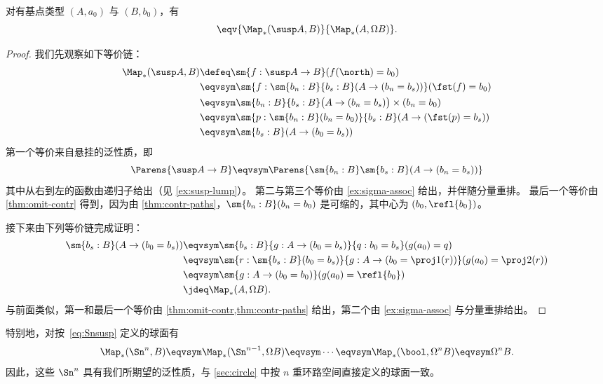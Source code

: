 \begin{lem}\label{lem:susp-loop-adj}
  对有基点类型 $(A,a_0)$ 与 $(B,b_0)$，有
  \[ \eqv{\Map_*(\susp A, B)}{\Map_*(A,\Omega B)}.\]
\end{lem}
\addtocounter{thm}{1}           %
\begin{proof}
我们先观察如下等价链：
\begin{align*}
\Map_*(\susp A, B) & \defeq \sm{f:\susp A\to B} (f(\north)=b_0) \\
                   & \eqvsym \sm{f:\sm{b_n : B}{b_s : B} (A \to (b_n = b_s))} (\fst(f)=b_0) \\
                   & \eqvsym \sm{b_n : B}{b_s : B} \big(A \to (b_n = b_s)\big) \times (b_n=b_0) \\
                   & \eqvsym \sm{p : \sm{b_n : B} (b_n=b_0)}{b_s : B} (A \to (\fst(p) = b_s)) \\
                   & \eqvsym \sm{b_s : B} (A \to (b_0 = b_s))
\end{align*}
第一个等价来自悬挂的泛性质，即
\[ \Parens{\susp A \to B} \eqvsym \Parens{\sm{b_n : B} \sm{b_s : B} (A \to (b_n = b_s)) } \]
其中从右到左的函数由递归子给出（见 \cref{ex:susp-lump}）。
第二与第三个等价由 \cref{ex:sigma-assoc} 给出，并伴随分量重排。
最后一个等价由 \cref{thm:omit-contr} 得到，因为由 \cref{thm:contr-paths}，$\sm{b_n : B} (b_n=b_0)$ 是可缩的，其中心为 $(b_0, \refl{b_0})$。

接下来由下列等价链完成证明：
\begin{align*}
  \sm{b_s : B} (A \to (b_0 = b_s))
  &\eqvsym \sm{b_s : B}{g:A \to (b_0 = b_s)}{q:b_0 = b_s} (g(a_0) = q)\\
  &\eqvsym \sm{r : \sm{b_s : B}(b_0 = b_s)}{g:A \to (b_0 = \proj1(r))} (g(a_0) = \proj2(r))\\
  &\eqvsym \sm{g:A \to (b_0 = b_0)} (g(a_0) = \refl{b_0})\\
  &\jdeq \Map_*(A,\Omega B).
\end{align*}
与前面类似，第一和最后一个等价由 \cref{thm:omit-contr,thm:contr-paths} 给出，第二个由 \cref{ex:sigma-assoc} 与分量重排给出。
\end{proof}

%
特别地，对按~\eqref{eq:Snsusp} 定义的球面有
%
\[ \Map_*(\Sn^n,B) \eqvsym \Map_*(\Sn^{n-1}, \Omega B) \eqvsym \cdots \eqvsym \Map_*(\bool,\Omega^n B) \eqvsym \Omega^n B. \]
因此，这些 $\Sn^n$ 具有我们所期望的泛性质，与 \cref{sec:circle} 中按 $n$ 重环路空间直接定义的球面一致。

